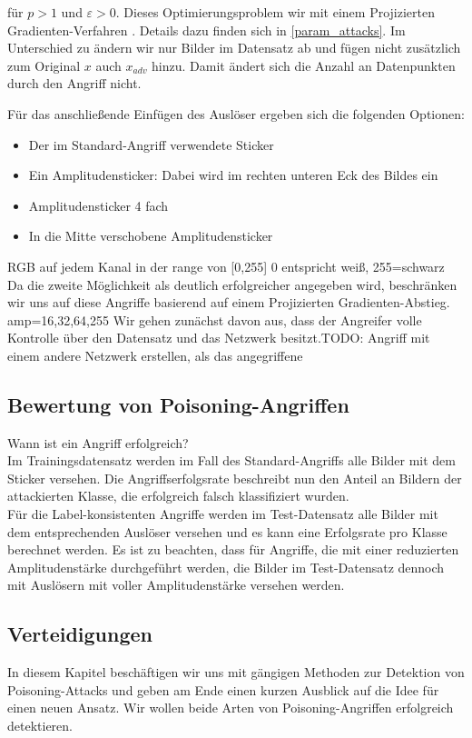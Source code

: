 \documentclass[11pt,a4paper]{article}
\numberwithin{equation}{section}
\begin{document}
	für $p >1 $ und $\varepsilon > 0$. Dieses Optimierungsproblem wir mit einem Projizierten Gradienten-Verfahren \cite{madry2017towards}. Details dazu finden sich in \autoref{param_attacks}. Im Unterschied zu \cite{labelconsistent} ändern wir nur Bilder im Datensatz ab und fügen nicht zusätzlich zum Original $x$ auch $x_{adv}$ hinzu. Damit ändert sich die Anzahl an Datenpunkten durch den Angriff nicht.
	
	Für das anschließende Einfügen des Auslöser ergeben sich die folgenden Optionen:
	\begin{itemize}
		\item Der im Standard-Angriff verwendete Sticker
		\item Ein Amplitudensticker: Dabei wird im rechten unteren Eck des Bildes ein 
		\item Amplitudensticker 4 fach
		\item In die Mitte verschobene Amplitudensticker
	\end{itemize}
	RGB auf jedem Kanal in der range von [0,255]
	0 entspricht weiß, 255=schwarz
	Da die zweite Möglichkeit als deutlich erfolgreicher angegeben wird, beschränken wir uns auf diese Angriffe basierend auf einem Projizierten Gradienten-Abstieg.
	amp=16,32,64,255
	Wir gehen zunächst davon aus, dass der Angreifer volle Kontrolle über den Datensatz und das Netzwerk besitzt.TODO: Angriff mit einem andere Netzwerk erstellen, als das angegriffene
	
	\subsection{Bewertung von Poisoning-Angriffen}
	
	Wann ist ein Angriff erfolgreich?\\
	Im Trainingsdatensatz werden im Fall des Standard-Angriffs alle Bilder mit dem Sticker versehen. Die Angriffserfolgsrate beschreibt nun den Anteil an Bildern der attackierten Klasse, die erfolgreich falsch klassifiziert wurden.\\
	
	Für die Label-konsistenten Angriffe werden im Test-Datensatz alle Bilder mit dem entsprechenden Auslöser versehen und es kann eine Erfolgsrate pro Klasse berechnet werden. Es ist zu beachten, dass für Angriffe, die mit einer reduzierten Amplitudenstärke durchgeführt werden, die Bilder im Test-Datensatz dennoch mit Auslösern mit voller Amplitudenstärke versehen werden. 
	
	\subsection{Verteidigungen}
	In diesem Kapitel beschäftigen wir uns mit gängigen Methoden zur Detektion von Poisoning-Attacks und geben am Ende einen kurzen Ausblick auf die Idee für einen neuen Ansatz.
	Wir wollen beide Arten von Poisoning-Angriffen erfolgreich detektieren. 
	
\end{document}
